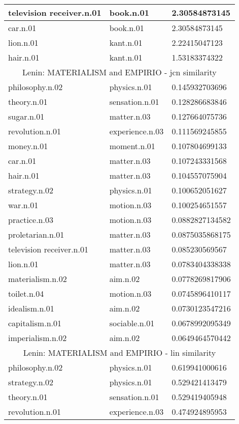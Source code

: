 \begin{center}
\begin{tabular}{ | l | l | l |}
television receiver.n.01 & book.n.01 & 2.30584873145\\ \hline
car.n.01 & book.n.01 & 2.30584873145\\ \hline
lion.n.01 & kant.n.01 & 2.22415047123\\ \hline
hair.n.01 & kant.n.01 & 1.53183374322\\ \hline
\multicolumn{3}{|c|}{Lenin: MATERIALISM and EMPIRIO - jcn similarity} \\ \hline
philosophy.n.02 & physics.n.01 & 0.145932703696\\ \hline
theory.n.01 & sensation.n.01 & 0.128286683846\\ \hline
sugar.n.01 & matter.n.03 & 0.127664075736\\ \hline
revolution.n.01 & experience.n.03 & 0.111569245855\\ \hline
money.n.01 & moment.n.01 & 0.107804699133\\ \hline
car.n.01 & matter.n.03 & 0.107243331568\\ \hline
hair.n.01 & matter.n.03 & 0.104557075904\\ \hline
strategy.n.02 & physics.n.01 & 0.100652051627\\ \hline
war.n.01 & motion.n.03 & 0.100254651557\\ \hline
practice.n.03 & motion.n.03 & 0.0882827134582\\ \hline
proletarian.n.01 & matter.n.03 & 0.0875035868175\\ \hline
television receiver.n.01 & matter.n.03 & 0.085230569567\\ \hline
lion.n.01 & matter.n.03 & 0.0783404338338\\ \hline
materialism.n.02 & aim.n.02 & 0.0778269817906\\ \hline
toilet.n.04 & motion.n.03 & 0.0745896410117\\ \hline
idealism.n.01 & aim.n.02 & 0.0730123547216\\ \hline
capitalism.n.01 & sociable.n.01 & 0.0678992095349\\ \hline
imperialism.n.02 & aim.n.02 & 0.0649464570442\\ \hline
\multicolumn{3}{|c|}{Lenin: MATERIALISM and EMPIRIO - lin similarity} \\ \hline
philosophy.n.02 & physics.n.01 & 0.619941000616\\ \hline
strategy.n.02 & physics.n.01 & 0.529421413479\\ \hline
theory.n.01 & sensation.n.01 & 0.529419405948\\ \hline
revolution.n.01 & experience.n.03 & 0.474924895953\\ \hline

\end{tabular}
\end{center}
